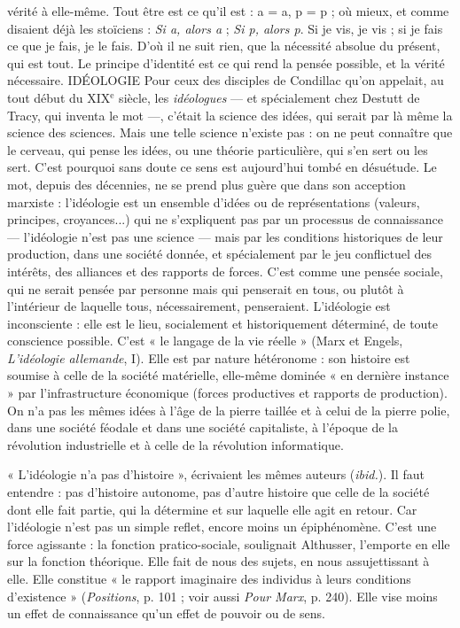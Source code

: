 vérité à elle-même. Tout être est ce qu’il est :
a = a, p = p ; où mieux, et comme disaient déjà les stoïciens : {\it Si a, alors a} ; {\it Si p,
alors p}. Si je vis, je vis ; si je fais ce que je fais, je le fais. D’où il ne suit rien, que
la nécessité absolue du présent, qui est tout.
Le principe d’identité est ce qui rend la pensée possible, et la vérité nécessaire.
IDÉOLOGIE Pour ceux des disciples de Condillac qu’on appelait, au tout
début du {\footnotesize XIX$^\text{e}$} siècle, les {\it idéologues} — et spécialement chez Destutt
de Tracy, qui inventa le mot —, c'était la science des idées, qui serait par là
même la science des sciences. Mais une telle science n’existe pas : on ne peut
connaître que le cerveau, qui pense les idées, ou une théorie particulière, qui
s’en sert ou les sert. C’est pourquoi sans doute ce sens est aujourd’hui tombé en
désuétude. Le mot, depuis des décennies, ne se prend plus guère que dans son
acception marxiste : l'idéologie est un ensemble d’idées ou de représentations
(valeurs, principes, croyances...) qui ne s'expliquent pas par un processus de
connaissance — l’idéologie n’est pas une science — mais par les conditions historiques
de leur production, dans une société donnée, et spécialement par le jeu
conflictuel des intérêts, des alliances et des rapports de forces. C’est comme une
pensée sociale, qui ne serait pensée par personne mais qui penserait en tous, ou
plutôt à l’intérieur de laquelle tous, nécessairement, penseraient. L’idéologie est
inconsciente : elle est le lieu, socialement et historiquement déterminé, de toute
conscience possible. C’est « le langage de la vie réelle » (Marx et Engels, {\it L'idéologie
allemande}, I). Elle est par nature hétéronome : son histoire est soumise à
celle de la société matérielle, elle-même dominée « en dernière instance » par
l'infrastructure économique (forces productives et rapports de production). On
n’a pas les mêmes idées à l’âge de la pierre taillée et à celui de la pierre polie,
dans une société féodale et dans une société capitaliste, à l’époque de la révolution
industrielle et à celle de la révolution informatique.

« L’idéologie n’a pas d’histoire », écrivaient les mêmes auteurs ({\it ibid.}). Il
faut entendre : pas d’histoire autonome, pas d’autre histoire que celle de la
société dont elle fait partie, qui la détermine et sur laquelle elle agit en retour.
Car l'idéologie n’est pas un simple reflet, encore moins un épiphénomène.
C’est une force agissante : la fonction pratico-sociale, soulignait Althusser,
l'emporte en elle sur la fonction théorique. Elle fait de nous des sujets, en nous
assujettissant à elle. Elle constitue « le rapport imaginaire des individus à leurs
conditions d’existence » ({\it Positions}, p. 101 ; voir aussi {\it Pour Marx}, p. 240). Elle
vise moins un effet de connaissance qu’un effet de pouvoir ou de sens.

